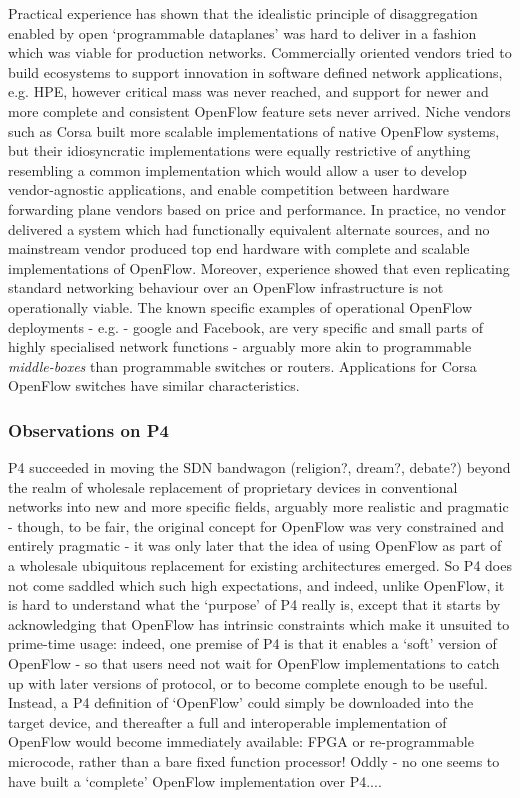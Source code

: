 Practical experience has shown that the idealistic principle of disaggregation enabled by open ‘programmable dataplanes’ was hard to deliver in a fashion which was viable for production networks.
Commercially oriented vendors tried to build ecosystems to support innovation in software defined network applications, e.g. HPE, however critical mass was never reached, and support for newer and more complete and consistent OpenFlow feature sets never arrived.
Niche vendors such as Corsa built more scalable implementations of native OpenFlow systems, but their idiosyncratic implementations were equally restrictive of anything resembling a common implementation which would allow a user to develop vendor-agnostic applications, and enable competition between hardware forwarding plane vendors based on price and performance.
In practice, no vendor delivered a system which had functionally equivalent alternate sources, and no mainstream vendor produced top end hardware with complete and scalable implementations of OpenFlow.
Moreover, experience showed that even replicating standard networking behaviour over an OpenFlow infrastructure is not operationally viable.
The known specific examples of operational OpenFlow deployments - e.g. - google and Facebook, are very specific and small parts of highly specialised network functions - arguably more akin to programmable \textit{middle-boxes} than programmable switches or routers.
Applications for Corsa OpenFlow switches have similar characteristics.

\subsubsection{Observations on P4}

P4 succeeded in moving the SDN bandwagon (religion?, dream?, debate?) beyond the realm of wholesale replacement of proprietary devices in conventional networks into new and more specific fields, arguably more realistic and pragmatic - though, to be fair, the original concept for OpenFlow was very constrained and entirely pragmatic - it was only later that the idea of using OpenFlow as part of a wholesale ubiquitous replacement for existing architectures emerged.
So P4 does not come saddled which such high expectations, and indeed, unlike OpenFlow, it is hard to understand what the ‘purpose’ of P4 really is, except that it starts by acknowledging that OpenFlow has intrinsic constraints which make it unsuited to prime-time usage: indeed, one premise of P4 is that it enables a ‘soft’ version of OpenFlow - so that users need not wait for OpenFlow implementations to catch up with later versions of protocol, or to become complete enough to be useful.
Instead, a P4 definition of ‘OpenFlow’ could simply be downloaded into the target device, and thereafter a full and interoperable implementation of OpenFlow would become immediately available: FPGA or re-programmable microcode, rather than a bare fixed function processor!
Oddly - no one seems to have built a ‘complete’ OpenFlow implementation over P4....

